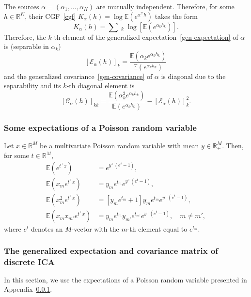 \documentclass{article}
\newcommand{\sbra}[1]{\left[#1\right]}
\newcommand{\R}{\mathbb{R}}
\newcommand{\ebb}{\mathbb{E}}
\newcommand{\sumk}{\sum\mathop{}_{k}}
\newcommand{\ccal}{\mathcal{C}}
\newcommand{\ecal}{\mathcal{E}}
\begin{document}
The sources $\alpha=(\alpha_1,\dots,\alpha_K)$ are mutually independent. Therefore, for some $h\in\R^K$, their CGF~\eqref{cgf} $K_{\alpha}(h) = \log\ebb({ e^{\alpha^{\top} h} })$ takes the form
$$
K_{\alpha}(h) = \sumk \log\sbra{\ebb ( e^{\alpha_k h_k} ) }.
$$ 
Therefore, the $k$-th element of the generalized expectation~\eqref{gen-expectation} of $\alpha$ is (separable in $\alpha_k$)
\begin{equation}\label{gen-expectation-alpha}
\sbra{\ecal_{\alpha}(h)}_k = \frac{\ebb ( \alpha_k e^{\alpha_k h_k} )}{\ebb ( e^{\alpha_k h_k} ) }
\end{equation}
and the generalized covariance~\eqref{gen-covariance} of $\alpha$ is diagonal due to the separability and its $k$-th diagonal element is
\begin{equation}\label{gen-covariance-alpha}
\sbra{\ccal_{\alpha}(h)}_{kk} = \frac{ \ebb (\alpha^2_k e^{\alpha_k h_k}) }{\ebb ( e^{\alpha_k h_k} ) } - \sbra{ \ecal_{\alpha} (h)}_k^2.
\end{equation}

\subsubsection{Some expectations of a Poisson random variable}
\label{app:epxectations-of-poisson}
 

Let $x\in\R^M$ be a multivariate Poisson random variable with mean $y\in\R_+^{M}$. Then, for some $t\in\R^M$,
$$
\begin{aligned}
\ebb ({ e^{t^{\top}x } }) &= e^{ y^{\top}(e^t - 1) }, \\
\ebb ({ x_m e^{t^{\top} x} }) &= y_m e^{t_m} e^{ y^{\top}(e^t - 1) }, \\
\ebb ({ x_m^2 e^{t^{\top} x } }) &= \sbra{y_m e^{t_m}+1}y_m e^{t_m} e^{ y^{\top}(e^t - 1) }, \\
\ebb ({ x_{m}x_{m'} e^{t^{\top} x} }) &= y_{m} e^{t_{m}} y_{m'} e^{t_{m'}} e^{ y^{\top}(e^t - 1) }, \quad m\ne m',
\end{aligned}
$$
where $e^t$ denotes an $M$-vector with the $m$-th element equal to $e^{t_m}$.


\subsubsection{The generalized expectation and covariance matrix of discrete ICA}
\label{app:derivations-dica-generalized-covariances}
In this section, we use the expectations of a Poisson random variable presented in Appendix~\ref{app:epxectations-of-poisson}.
 
\end{document}
